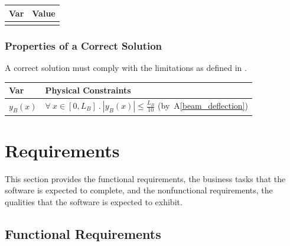 \documentclass[12pt]{article}
\newcommand{\aref}[1]{A\ref{#1}}
\begin{document}
\begin{table}[H]
    \caption{Specification Parameter Values} \label{TblSpecParams}
    \renewcommand{\arraystretch}{1.2}
    \noindent \begin{longtable*}{l l}
        \toprule
        \textbf{Var} & \textbf{Value} \\
        \midrule
        \textemdash{} & \textemdash{} \\
        \bottomrule
    \end{longtable*}
\end{table}

\subsubsection{Properties of a Correct Solution}
\label{sec_CorrectSolution}

\noindent{}A correct solution must comply with the limitations as defined in
.

\begin{table}[H]
    \caption{Output Variables}
    \label{TblOutputVar}
    \renewcommand{\arraystretch}{1.2}
    \noindent \begin{longtable*}{l l}
        \toprule
        \textbf{Var} & \textbf{Physical Constraints} \\
        \midrule
        $y_{B}(x)$ & $\forall~x \in [0, L_B]~.~|y_{B}(x)| \leq \frac{L_B}{10}$ (by~\aref{beam_deflection})
        \\
        \bottomrule
    \end{longtable*}
\end{table}



\section{Requirements}

This section provides the functional requirements, the business tasks that the
software is expected to complete, and the nonfunctional requirements, the
qualities that the software is expected to exhibit.

\subsection{Functional Requirements}
\end{document}
